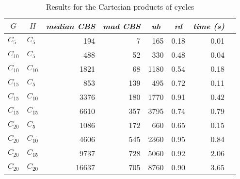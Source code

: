 \documentclass{scrartcl}
\theoremstyle{plain}
\newcommand{\cbs}{CBS}
\begin{document}
\begin{table}[!ht]
	\centering
	\scriptsize
	\begin{tabular}{|ll|rr|r|r|r|r|} 
	\hline
	\multicolumn{1}{|c}{$G$} &
	\multicolumn{1}{c|}{$H$} &
	\multicolumn{1}{c}{\emph{median \cbs{}}} &
	\multicolumn{1}{c|}{\emph{mad \cbs{}}} &
	\multicolumn{1}{c|}{\emph{ub}} &
	\multicolumn{1}{c|}{\emph{rd}} &
	\multicolumn{1}{c|}{\emph{time (s)}} \\ \hline
		
	\makeatletter{}$C_{5}$ & $C_{5}$ & 194 & 7 & 165 & 0.18 & 0.01 \\ 
$C_{10}$ & $C_{5}$ & 488 & 52 & 330 & 0.48 & 0.04 \\ 
$C_{10}$ & $C_{10}$ & 1821 & 68 & 1180 & 0.54 & 0.18 \\ 
$C_{15}$ & $C_{5}$ & 853 & 139 & 495 & 0.72 & 0.11 \\ 
$C_{15}$ & $C_{10}$ & 3376 & 180 & 1770 & 0.91 & 0.42 \\ 
$C_{15}$ & $C_{15}$ & 6610 & 357 & 3795 & 0.74 & 0.79 \\ 
$C_{20}$ & $C_{5}$ & 1086 & 172 & 660 & 0.65 & 0.15 \\ 
$C_{20}$ & $C_{10}$ & 4606 & 545 & 2360 & 0.95 & 0.84 \\ 
$C_{20}$ & $C_{15}$ & 9737 & 728 & 5060 & 0.92 & 2.06 \\ 
$C_{20}$ & $C_{20}$ & 16637 & 705 & 8760 & 0.90 & 3.65 \\ 
 
	
	\hline
	\end{tabular}
	\caption{\label{tab:cart_cc_perf}Results for the Cartesian products of 
cycles}

\end{table}

\clearpage
\end{document}
